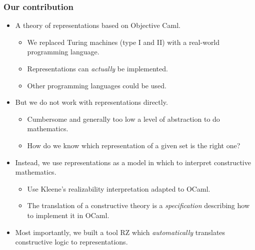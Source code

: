 \documentclass[t,handout]{beamer}
\begin{document}
\begin{frame}
  \frametitle{Our contribution}

  \begin{itemize}
  \item A theory of representations based on Objective Caml.
    \begin{itemize}[<.->]
    \item We replaced Turing machines (type I and II) with a
      real-world programming language.
    \item Representations can \emph{actually} be implemented.
    \item Other programming languages could be used.
    \end{itemize}
  \item But we do not work with representations directly.
    \begin{itemize}[<.->]
    \item Cumbersome and generally too low a level of abstraction to
      do mathematics.
    \item How do we know which representation of a given set is the
      right one?
    \end{itemize}
  \item Instead, we use representations as a model in which to
    interpret constructive mathematics.
    \begin{itemize}[<.->]
    \item Use Kleene's realizability interpretation adapted to OCaml.
    \item The translation of a constructive theory is a
      \emph{specification} describing how to implement it in OCaml.
    \end{itemize}
  \item Most importantly, we built a tool RZ which
    \emph{automatically} translates constructive logic to representations.
  \end{itemize}
\end{frame}
\end{document}
